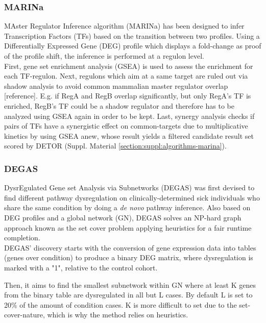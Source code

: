 \subsubsection{MARINa}
MAster Regulator Inference algorithm (MARINa) \cite{Lefebvre2010ACenters} has been designed to infer Transcription Factors (TFs) based on the transition between two profiles. Using a Differentially Expressed Gene (DEG) profile which displays a fold-change as proof of the profile shift, the inference is performed at a regulon level.
\\

First, gene set enrichment analysis (GSEA) \cite{Subramanian2005GeneProfiles} is used to assess the enrichment for each TF-regulon. Next, regulons which aim at a same target are ruled out via shadow analysis to avoid common mammalian master regulator overlap [reference]. E.g. if  RegA and RegB overlap significantly, but only RegA's TF is enriched, RegB’s TF could be a shadow regulator and therefore has to be analyzed using GSEA again in order to be kept.
Last, synergy analysis checks if pairs of TFs have a synergistic effect on common-targets due to multiplicative kinetics by using GSEA anew, whose result yields a filtered candidate result set scored by DETOR (Suppl. Material \ref{section:suppl:algorithms-marina}).

\subsubsection{DEGAS}
DysrEgulated Gene set Analysis via Subnetworks (DEGAS) \cite{Ulitsky2010DEGAS:Diseases} was first devised to find different pathway dysregulation on clinically-determined sick individuals who share the same condition by doing a \textit{de novo} pathway inference. Also based on DEG profiles and a global network (GN), DEGAS solves an NP-hard graph approach known as the set cover problem applying heuristics for a fair runtime completion.
\\

DEGAS’ discovery starts with the conversion of gene expression data into tables (genes over condition) to produce a binary DEG matrix, where dysregulation is marked with a "1", relative to the control cohort.

Then, it aims to find the smallest subnetwork within GN where at least K genes from the binary table are dysregulated in all but L cases. By default L is set to 20\% of the amount of condition cases. K is more difficult to set due to the set-cover-nature, which is why the method relies on heuristics. 
\\

